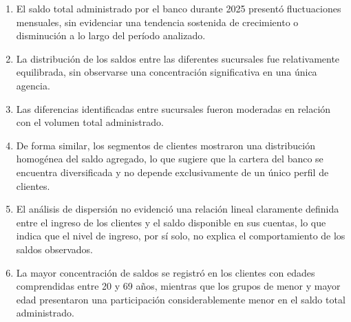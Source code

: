 \begin{enumerate}
    \item El saldo total administrado por el banco durante 2025 presentó fluctuaciones mensuales, sin evidenciar una tendencia sostenida de crecimiento o disminución a lo largo del período analizado.
    \item La distribución de los saldos entre las diferentes sucursales fue relativamente equilibrada, sin observarse una concentración significativa en una única agencia.
    \item Las diferencias identificadas entre sucursales fueron moderadas en relación con el volumen total administrado.
    \item De forma similar, los segmentos de clientes mostraron una distribución homogénea del saldo agregado, lo que sugiere que la cartera del banco se encuentra diversificada y no depende exclusivamente de un único perfil de clientes.
    \item El análisis de dispersión no evidenció una relación lineal claramente definida entre el ingreso de los clientes y el saldo disponible en sus cuentas, lo que indica que el nivel de ingreso, por sí solo, no explica el comportamiento de los saldos observados.
    \item La mayor concentración de saldos se registró en los clientes con edades comprendidas entre 20 y 69 años, mientras que los grupos de menor y mayor edad presentaron una participación considerablemente menor en el saldo total administrado.
\end{enumerate}
